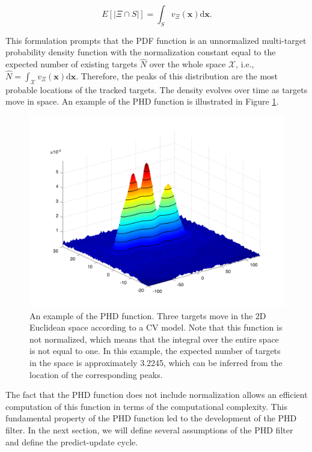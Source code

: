 \begin{equation}\label{eq:phd-func-integral}
    E[| \Xi \cap S |] = \int_S v_\Xi(\mathbf{x}) \mathrm{d} \mathbf{x}.
\end{equation}

This formulation prompts that the PDF function is an unnormalized multi-target probability density function with the normalization constant equal to the expected number of existing targets $\hat{N}$ over the whole space $\mathcal{X}$, i.e., $\hat{N} = \int_\mathcal{X} v_\Xi(\mathbf{x}) \mathrm{d} \mathbf{x}$. Therefore, the peaks of this distribution are the most probable locations of the tracked targets. The density evolves over time as targets move in space. An example of the PHD function is illustrated in Figure \ref{fig:phd-function}.

\begin{figure}
    \centering
    \includegraphics[width=.6\linewidth]{figures/phd-function.png}
    \caption[PHD function example.]{An example of the PHD function. Three targets move in the 2D Euclidean space according to a CV model. Note that this function is not normalized, which means that the integral over the entire space is not equal to one. In this example, the expected number of targets in the space is approximately 3.2245, which can be inferred from the location of the corresponding peaks.}
    \label{fig:phd-function}
\end{figure}

The fact that the PHD function does not include normalization allows an efficient computation of this function in terms of the computational complexity. This fundamental property of the PHD function led to the development of the PHD filter. In the next section, we will define several assumptions of the PHD filter and define the predict-update cycle.
